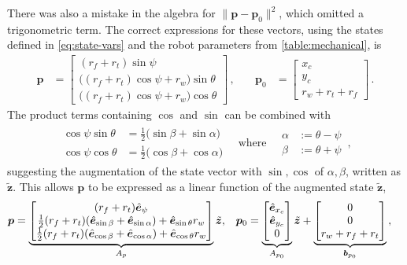 \documentclass[main.tex]{subfiles}
\begin{document}
	There was also a mistake in the algebra for $\|\bm{p} - \bm p_0\|^2$, which omitted a trigonometric term.
	The correct expressions for these vectors, using the states defined in \cref{eq:state-vars} and the robot parameters from \cref{table:mechanical}, is
	\begin{align}
			\bm{p} &= \begin{bmatrix}
				(r_f + r_t) \sin \psi \\
				\big((r_f + r_t) \cos \psi + r_w\big) \sin\theta \\
				\big((r_f + r_t) \cos \psi + r_w\big) \cos\theta
			\end{bmatrix}\,,
		\quad&
			\bm{p}_0 &= \begin{bmatrix}
				x_c \\
				y_c \\
				r_w + r_t + r_f
			\end{bmatrix}\,.
	\end{align}
	The product terms containing $\cos$ and $\sin$ can be combined with
	\begin{align}
		\begin{aligned}
			\cos \psi \sin\theta &= \tfrac{1}{2} \big(
				\sin \beta + \sin \alpha
			\big) \\
			\cos \psi \cos\theta &= \tfrac{1}{2} \big(
				\cos \beta + \cos \alpha
			\big)
		\end{aligned}
		\quad\text{where}\quad
		\begin{aligned}
		\alpha &:= \theta - \psi \\
		\beta &:= \theta + \psi
		\end{aligned}\,,
	\end{align}
	suggesting the augmentation of the state vector with $\sin, \cos$ of $\alpha, \beta$, written as $\tilde{\bm{z}}$.
	This allows $\bm{p}$ to be expressed as a linear function of the augmented state $\tilde{\bm{z}}$,
	\begin{align}
		\bm{p} &= \underbrace{\begin{bmatrix}
			(r_f + r_t) \hat{\bm{e}}_{\psi} \\
			\tfrac{1}{2} (r_f + r_t) (\hat{\bm{e}}_{\sin \beta} + \hat{\bm{e}}_{\sin \alpha}) +
			 \hat{\bm{e}}_{\sin \theta} r_w \\
			\tfrac{1}{2} (r_f + r_t) (\hat{\bm{e}}_{\cos \beta} + \hat{\bm{e}}_{\cos \alpha}) +
			 \hat{\bm{e}}_{\cos \theta} r_w
		\end{bmatrix}}_{A_p} \tilde{\bm{z}}, &
		\bm{p}_0 &= \underbrace{\begin{bmatrix}
			\hat{\bm{e}}_{x_c} \\
			\hat{\bm{e}}_{y_c} \\
			0
		\end{bmatrix}}_{A_{p_0}} \tilde{\bm{z}} +
		\underbrace{\begin{bmatrix} 0 \\ 0 \\ r_w + r_f + r_t \end{bmatrix}}_{\bm{b}_{p_0}}\,,
	\end{align}
\end{document}
